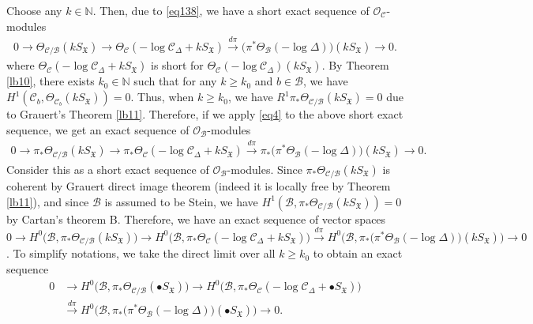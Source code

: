 \documentclass[12pt,a4paper,notitlepage]{report}
\theoremstyle{definition}
\theoremstyle{plain}
\newcommand{\fk}{\mathfrak}
\newcommand{\mc}{\mathcal}
\newcommand{\scr}{\mathscr}
\newcommand{\blt}{\bullet}
\newcommand{\Nbb}{\mathbb N}
\numberwithin{equation}{section}
\begin{document}
Choose any $k\in\Nbb$. Then, due to \eqref{eq138}, we have a short exact sequence of $\scr O_{\mc C}$-modules
\begin{align*}
0\rightarrow \Theta_{\mc C/\mc B}(kS_{\fk X})\rightarrow \Theta_{\mc C}(-\log \mc C_\Delta+kS_{\fk X})\xrightarrow{d\pi}\big(\pi^*\Theta_{\mc B}(-\log \Delta)\big)(kS_{\fk X})\rightarrow 0.
\end{align*}
where $\Theta_{\mc C}(-\log \mc C_\Delta+kS_{\fk X})$ is short for $\Theta_{\mc C}(-\log \mc C_\Delta)(kS_{\fk X})$. By Theorem \ref{lb10}, there exists $k_0\in\Nbb$ such that for any $k\geq k_0$ and $b\in \mc B$, we have $H^1(\mc C_b,\Theta_{\mc C_b}(kS_{\fk X}))=0$. Thus, when $k\geq k_0$, we have $R^1\pi_*\Theta_{\mc C/\mc B}(kS_{\fk X})=0$ due to Grauert's
Theorem \ref{lb11}. Therefore, if we apply \eqref{eq4} to the above short exact sequence, we get an exact sequence of $\scr O_{\mc B}$-modules
\begin{align*}
0\rightarrow \pi_*\Theta_{\mc C/\mc B}(k S_{\fk X})\rightarrow \pi_*\Theta_{\mc C}(-\log \mc C_\Delta+k S_{\fk X})\xrightarrow{d\pi}\pi_*\big(\pi^*\Theta_{\mc B}(-\log \Delta)\big)(k S_{\fk X})
\rightarrow 0.
\end{align*}
Consider this as a short exact sequence of $\scr O_{\mc B}$-modules. Since $\pi_*\Theta_{\mc C/\mc B}(k S_{\fk X})$ is coherent by Grauert direct image theorem (indeed it is locally free by Theorem \ref{lb11}), and since $\mc B$ is assumed to be Stein, we have $H^1(\mc B,\pi_*\Theta_{\mc C/\mc B}(k S_{\fk X}))=0$ by Cartan's theorem B. Therefore, we have an exact sequence of vector spaces $0\rightarrow H^0\big(\mc B,\pi_*\Theta_{\mc C/\mc B}(k S_{\fk X})\big)\rightarrow H^0\big(\mc B,\pi_*\Theta_{\mc C}(-\log \mc C_\Delta+k S_{\fk X})\big)\xrightarrow{d\pi}H^0\big(\mc B,\pi_*\big(\pi^*\Theta_{\mc B}(-\log \Delta)\big)(k S_{\fk X})\big)
\rightarrow 0$. To simplify notations, we take the direct limit over all $k\geq k_0$ to obtain an exact sequence 
\begin{align}
0&\rightarrow H^0\big(\mc B,\pi_*\Theta_{\mc C/\mc B}(\blt S_{\fk X})\big)\rightarrow H^0\big(\mc B,\pi_*\Theta_{\mc C}(-\log \mc C_\Delta+\blt S_{\fk X})\big)\nonumber\\
&\xrightarrow{d\pi}H^0\big(\mc B,\pi_*\big(\pi^*\Theta_{\mc B}(-\log \Delta)\big)(\blt S_{\fk X})\big)
\rightarrow 0.\label{eq151}
\end{align}
\end{document}
